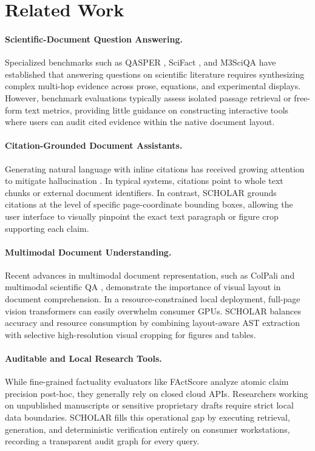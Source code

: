 \section{Related Work}
\label{sec:related_work}

\paragraph{Scientific-Document Question Answering.}
Specialized benchmarks such as QASPER \citep{dasigi2021qasper}, SciFact \citep{wadden2020scifact}, and M3SciQA \citep{li2024m3sciqa} have established that answering questions on scientific literature requires synthesizing complex multi-hop evidence across prose, equations, and experimental displays. However, benchmark evaluations typically assess isolated passage retrieval or free-form text metrics, providing little guidance on constructing interactive tools where users can audit cited evidence within the native document layout.

\paragraph{Citation-Grounded Document Assistants.}
Generating natural language with inline citations has received growing attention to mitigate hallucination \citep{gao2023alce,asai2024selfrag,verma2026reflectiverag}. In typical systems, citations point to whole text chunks or external document identifiers. In contrast, \textsc{SCHOLAR} grounds citations at the level of specific page-coordinate bounding boxes, allowing the user interface to visually pinpoint the exact text paragraph or figure crop supporting each claim.

\paragraph{Multimodal Document Understanding.}
Recent advances in multimodal document representation, such as ColPali \citep{faysse2025colpali} and multimodal scientific QA \citep{pramanick2024spiqa,wang2026arqa}, demonstrate the importance of visual layout in document comprehension. In a resource-constrained local deployment, full-page vision transformers can easily overwhelm consumer GPUs. \textsc{SCHOLAR} balances accuracy and resource consumption by combining layout-aware AST extraction \citep{shen2026ocr} with selective high-resolution visual cropping for figures and tables.

\paragraph{Auditable and Local Research Tools.}
While fine-grained factuality evaluators like FActScore \citep{min2023factscore} analyze atomic claim precision post-hoc, they generally rely on closed cloud APIs. Researchers working on unpublished manuscripts or sensitive proprietary drafts require strict local data boundaries. \textsc{SCHOLAR} fills this operational gap by executing retrieval, generation, and deterministic verification entirely on consumer workstations, recording a transparent audit graph for every query.
